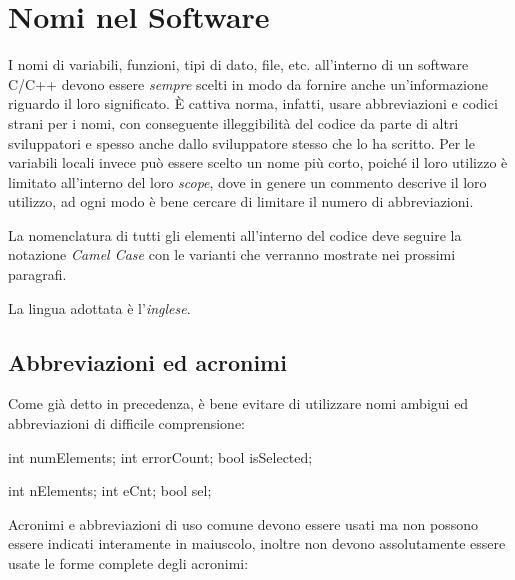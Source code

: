 %

\section{Nomi nel Software}\label{sec:name}

I nomi di variabili, funzioni, tipi di dato, file, etc. all'interno di un software C/C++ devono essere \emph{sempre} scelti in modo da fornire anche un'informazione riguardo il loro significato.
È cattiva norma, infatti, usare abbreviazioni e codici strani per i nomi, con conseguente illeggibilità del codice da parte di altri sviluppatori e spesso anche dallo sviluppatore stesso che lo ha scritto.
Per le variabili locali invece può essere scelto un nome più corto, poiché il loro utilizzo è limitato all'interno del loro \emph{scope}, dove in genere un commento descrive il loro utilizzo, ad ogni modo è bene cercare di limitare il numero di abbreviazioni. 

La nomenclatura di tutti gli elementi all'interno del codice deve seguire la notazione \emph{Camel Case}\cite{codestyle:camel} con le varianti che verranno mostrate nei prossimi paragrafi.

La lingua adottata è l'\emph{inglese}.

\subsection{Abbreviazioni ed acronimi}\label{ssec:abbreviations}

Come già detto in precedenza, è bene evitare di utilizzare nomi ambigui ed abbreviazioni di difficile comprensione:

\noindent\begin{minipage}[t]{\cbwidth}
\begin{RightCode}
int numElements;
int errorCount;
bool isSelected;
\end{RightCode}
\end{minipage}%
\hspace{\cbdistance}
\begin{minipage}[t]{\cbwidth}
\begin{ErrorCode}
int nElements;
int eCnt;
bool sel;
\end{ErrorCode}
\end{minipage}

Acronimi e abbreviazioni di uso comune devono essere usati ma non possono essere indicati interamente in maiuscolo, inoltre non devono assolutamente essere usate le forme complete degli acronimi:

